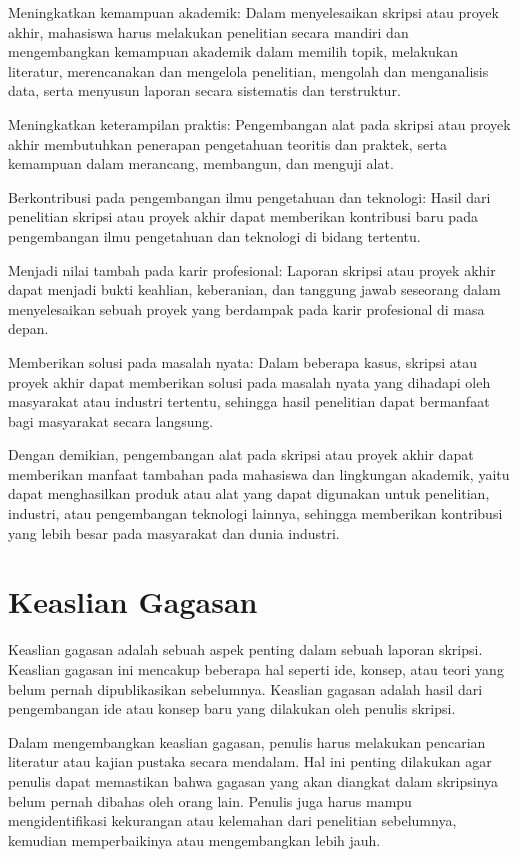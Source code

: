 \begin{packed_item}
    \item Meningkatkan kemampuan akademik: Dalam menyelesaikan skripsi atau proyek akhir, mahasiswa harus melakukan penelitian secara mandiri dan mengembangkan kemampuan akademik dalam memilih topik, melakukan literatur, merencanakan dan mengelola penelitian, mengolah dan menganalisis data, serta menyusun laporan secara sistematis dan terstruktur.
    \item Meningkatkan keterampilan praktis: Pengembangan alat pada skripsi atau proyek akhir membutuhkan penerapan pengetahuan teoritis dan praktek, serta kemampuan dalam merancang, membangun, dan menguji alat.
    \item Berkontribusi pada pengembangan ilmu pengetahuan dan teknologi: Hasil dari penelitian skripsi atau proyek akhir dapat memberikan kontribusi baru pada pengembangan ilmu pengetahuan dan teknologi di bidang tertentu.
    \item Menjadi nilai tambah pada karir profesional: Laporan skripsi atau proyek akhir dapat menjadi bukti keahlian, keberanian, dan tanggung jawab seseorang dalam menyelesaikan sebuah proyek yang berdampak pada karir profesional di masa depan.
    \item Memberikan solusi pada masalah nyata: Dalam beberapa kasus, skripsi atau proyek akhir dapat memberikan solusi pada masalah nyata yang dihadapi oleh masyarakat atau industri tertentu, sehingga hasil penelitian dapat bermanfaat bagi masyarakat secara langsung.
\end{packed_item}

Dengan demikian, pengembangan alat pada skripsi atau proyek akhir dapat memberikan manfaat tambahan pada mahasiswa dan lingkungan akademik, yaitu dapat menghasilkan produk atau alat yang dapat digunakan untuk penelitian, industri, atau pengembangan teknologi lainnya, sehingga memberikan kontribusi yang lebih besar pada masyarakat dan dunia industri.

\section{Keaslian Gagasan}
Keaslian gagasan adalah sebuah aspek penting dalam sebuah laporan skripsi. Keaslian gagasan ini mencakup beberapa hal seperti ide, konsep, atau teori yang belum pernah dipublikasikan sebelumnya. Keaslian gagasan adalah hasil dari pengembangan ide atau konsep baru yang dilakukan oleh penulis skripsi.

Dalam mengembangkan keaslian gagasan, penulis harus melakukan pencarian literatur atau kajian pustaka secara mendalam. Hal ini penting dilakukan agar penulis dapat memastikan bahwa gagasan yang akan diangkat dalam skripsinya belum pernah dibahas oleh orang lain. Penulis juga harus mampu mengidentifikasi kekurangan atau kelemahan dari penelitian sebelumnya, kemudian memperbaikinya atau mengembangkan lebih jauh.


